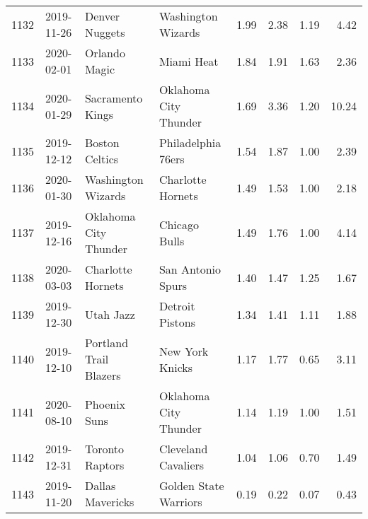 \documentclass[
  11pt,
]{article}
\theoremstyle{nonumberplain}
\begin{document}
\begin{longtable}{rl|llr|rrr}
1132 & 2019-11-26 & Denver Nuggets & Washington Wizards & 1.99 & 2.38 & 1.19 & 4.42\\
1133 & 2020-02-01 & Orlando Magic & Miami Heat & 1.84 & 1.91 & 1.63 & 2.36\\
1134 & 2020-01-29 & Sacramento Kings & Oklahoma City Thunder & 1.69 & 3.36 & 1.20 & 10.24\\
1135 & 2019-12-12 & Boston Celtics & Philadelphia 76ers & 1.54 & 1.87 & 1.00 & 2.39\\
1136 & 2020-01-30 & Washington Wizards & Charlotte Hornets & 1.49 & 1.53 & 1.00 & 2.18\\
1137 & 2019-12-16 & Oklahoma City Thunder & Chicago Bulls & 1.49 & 1.76 & 1.00 & 4.14\\
1138 & 2020-03-03 & Charlotte Hornets & San Antonio Spurs & 1.40 & 1.47 & 1.25 & 1.67\\
1139 & 2019-12-30 & Utah Jazz & Detroit Pistons & 1.34 & 1.41 & 1.11 & 1.88\\
1140 & 2019-12-10 & Portland Trail Blazers & New York Knicks & 1.17 & 1.77 & 0.65 & 3.11\\
1141 & 2020-08-10 & Phoenix Suns & Oklahoma City Thunder & 1.14 & 1.19 & 1.00 & 1.51\\
1142 & 2019-12-31 & Toronto Raptors & Cleveland Cavaliers & 1.04 & 1.06 & 0.70 & 1.49\\
1143 & 2019-11-20 & Dallas Mavericks & Golden State Warriors & 0.19 & 0.22 & 0.07 & 0.43\\*
\end{longtable}
\endgroup{}
\end{document}
